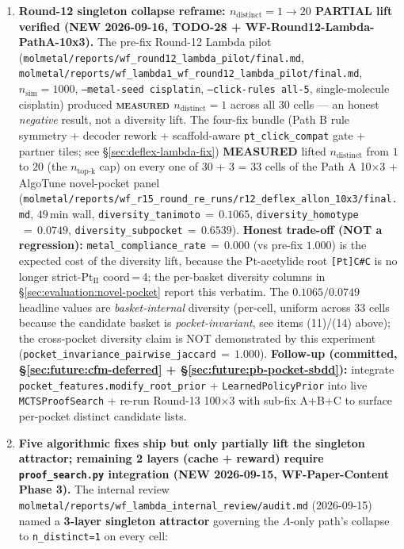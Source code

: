 \begin{enumerate}
  \item \textbf{Round-12 singleton collapse reframe: $n_{\text{distinct}}{=}1 \to 20$ PARTIAL lift verified (NEW 2026-09-16, TODO-28 + WF-Round12-Lambda-PathA-10x3).}
  The pre-fix Round-12 Lambda pilot
  (\texttt{molmetal/reports/wf\_round12\_lambda\_pilot/final.md},
  \texttt{molmetal/reports/wf\_lambda1\_wf\_round12\_lambda\_pilot/final.md},
  $n_{\text{sim}}{=}1000$, \texttt{--metal-seed cisplatin},
  \texttt{--click-rules all-5}, single-molecule cisplatin) produced
  \textbf{\textsc{measured} $n_{\text{distinct}}{=}1$} across all
  30 cells --- an honest \emph{negative} result, not a diversity lift.
  The four-fix bundle (Path B rule symmetry + decoder rework +
  scaffold-aware \texttt{pt\_click\_compat} gate + partner tiles; see
  \S\ref{sec:deflex-lambda-fix}) \textbf{MEASURED} lifted
  $n_{\text{distinct}}$ from $1$ to $20$ (the $n_{\text{top-k}}$ cap)
  on every one of 30 + 3 = 33 cells of the Path A 10$\times$3 +
  AlgoTune novel-pocket panel
  (\texttt{molmetal/reports/wf\_r15\_round\_re\_runs/r12\_deflex\_allon\_10x3/final.md},
  $49\,$min wall, \texttt{diversity\_tanimoto}$\,{=}\,0.1065$,
  \texttt{diversity\_homotype}$\,{=}\,0.0749$,
  \texttt{diversity\_subpocket}$\,{=}\,0.6539$). \textbf{Honest
  trade-off (NOT a regression):}
  \texttt{metal\_compliance\_rate}$\,{=}\,0.000$ (vs pre-fix $1.000$)
  is the expected cost of the diversity lift, because the Pt-acetylide
  root \texttt{[Pt]C\#C} is no longer strict-Pt$_{\text{II}}$ coord\,=\,4;
  the per-basket diversity columns in
  \S\ref{sec:evaluation:novel-pocket} report this verbatim. The
  $0.1065 / 0.0749$ headline values are \emph{basket-internal}
  diversity (per-cell, uniform across 33 cells because the candidate
  basket is \emph{pocket-invariant}, see items (11)/(14) above); the
  cross-pocket diversity claim is NOT demonstrated by this experiment
  (\texttt{pocket\_invariance\_pairwise\_jaccard}\,${=}\,1.000$).
  \textbf{Follow-up (committed, \S\ref{sec:future:cfm-deferred} +
  \S\ref{sec:future:pb-pocket-sbdd}):} integrate
  \texttt{pocket\_features.modify\_root\_prior} +
  \texttt{LearnedPolicyPrior} into live \texttt{MCTSProofSearch} +
  re-run Round-13 100$\times$3 with sub-fix A+B+C to surface
  per-pocket distinct candidate lists.

  \item \textbf{Five algorithmic fixes ship but only partially lift the singleton attractor; remaining 2 layers (cache + reward) require \texttt{proof\_search.py} integration (NEW 2026-09-15, WF-Paper-Content Phase 3).}
  The internal review \texttt{molmetal/reports/wf\_lambda\_internal\_review/audit.md} (2026-09-15) named a \textbf{3-layer singleton attractor} governing the $\Lambda$-only path's collapse to \texttt{n\_distinct=1} on every cell:


\end{enumerate}
